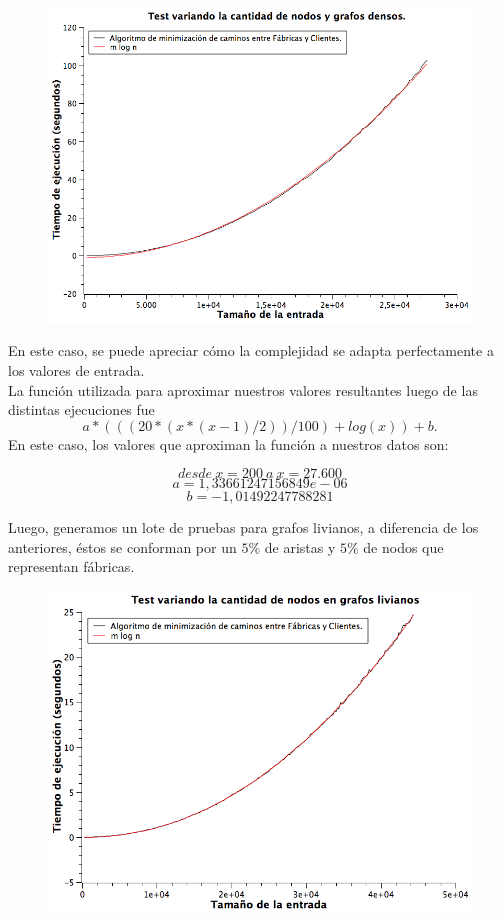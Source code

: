 \begin{figure}[H]
\begin{center}
	\includegraphics[width=350pt]{../tests/ej3/EJ3-nodo-var-denso.png}
\end{center}
\end{figure}

En este caso, se puede apreciar cómo la complejidad se adapta perfectamente a los valores de entrada.\\
La función utilizada para aproximar nuestros valores resultantes luego de las distintas ejecuciones fue $$a*(((20*(x*(x-1)/2)) / 100) + log(x)) + b.$$
En este caso, los valores que aproximan la función a nuestros datos son:

$$desde\ x = 200\ a\ x = 27.600 $$
$$a  = 1,33661247156849e-06$$
$$b  = -1,01492247788281 $$

Luego, generamos un lote de pruebas para grafos livianos, a diferencia de los anteriores, éstos se conforman por un $5\%$ de aristas y $5\%$ de nodos que representan fábricas.

\begin{figure}[H]
\begin{center}
	\includegraphics[width=350pt]{../tests/ej3/EJ3-nodo-var-liviano.png}
\end{center}
\end{figure}

